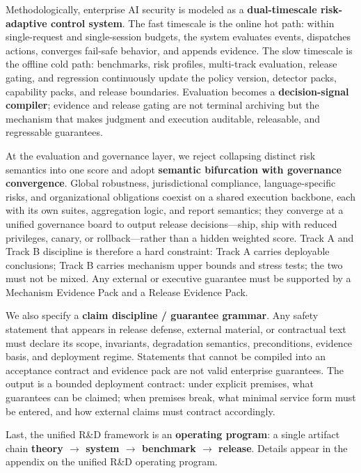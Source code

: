 \documentclass[11pt,a4paper]{report}
\begin{document}
{Methodologically, enterprise AI security is modeled as a \textbf{dual-timescale risk-adaptive control system}. The fast timescale is the online hot path: within single-request and single-session budgets, the system evaluates events, dispatches actions, converges fail-safe behavior, and appends evidence. The slow timescale is the offline cold path: benchmarks, risk profiles, multi-track evaluation, release gating, and regression continuously update the policy version, detector packs, capability packs, and release boundaries. Evaluation becomes a \textbf{decision-signal compiler}; evidence and release gating are not terminal archiving but the mechanism that makes judgment and execution auditable, releasable, and regressable guarantees.

At the evaluation and governance layer, we reject collapsing distinct risk semantics into one score and adopt \textbf{semantic bifurcation with governance convergence}. Global robustness, jurisdictional compliance, language-specific risks, and organizational obligations coexist on a shared execution backbone, each with its own suites, aggregation logic, and report semantics; they converge at a unified governance board to output release decisions—ship, ship with reduced privileges, canary, or rollback—rather than a hidden weighted score. Track A and Track B discipline is therefore a hard constraint: Track A carries deployable conclusions; Track B carries mechanism upper bounds and stress tests; the two must not be mixed. Any external or executive guarantee must be supported by a Mechanism Evidence Pack and a Release Evidence Pack.

We also specify a \textbf{claim discipline / guarantee grammar}. Any safety statement that appears in release defense, external material, or contractual text must declare its scope, invariants, degradation semantics, preconditions, evidence basis, and deployment regime. Statements that cannot be compiled into an acceptance contract and evidence pack are not valid enterprise guarantees. The output is a bounded deployment contract: under explicit premises, what guarantees can be claimed; when premises break, what minimal service form must be entered, and how external claims must contract accordingly.

Last, the unified R\&D framework is an \textbf{operating program}: a single artifact chain \textbf{theory $\rightarrow$ system $\rightarrow$ benchmark $\rightarrow$ release}. Details appear in the appendix on the unified R\&D operating program.
}
\end{document}
